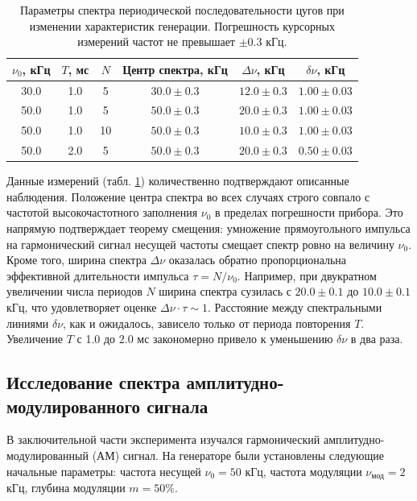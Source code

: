 \documentclass[reprint, amsmath, amssymb, aps, pra, nofootinbib]{revtex4-2}
\begin{document}
\begin{table}[ht!]
    \caption{Параметры спектра периодической последовательности цугов при изменении характеристик генерации. Погрешность курсорных измерений частот не превышает $\pm 0.3$ кГц.}
    \label{tab:burst_params}
    \centering
    \begin{ruledtabular}
    \begin{tabular}{cccccc}
        $\nu_0$, кГц & $T$, мс & $N$ & Центр спектра, кГц & $\Delta\nu$, кГц & $\delta\nu$, кГц \\
        \hline
        30.0 & 1.0 & 5  & $30.0 \pm 0.3$ & $12.0 \pm 0.3$ & $1.00 \pm 0.03$ \\
        50.0 & 1.0 & 5  & $50.0 \pm 0.3$ & $20.0 \pm 0.3$ & $1.00 \pm 0.03$ \\
        50.0 & 1.0 & 10 & $50.0 \pm 0.3$ & $10.0 \pm 0.3$ & $1.00 \pm 0.03$ \\
        50.0 & 2.0 & 5  & $50.0 \pm 0.3$ & $20.0 \pm 0.3$ & $0.50 \pm 0.03$ \\
    \end{tabular}
    \end{ruledtabular}
\end{table}

Данные измерений (табл. \ref{tab:burst_params}) количественно подтверждают описанные наблюдения. Положение центра спектра во всех случаях строго совпало с частотой высокочастотного заполнения $\nu_0$ в пределах погрешности прибора. Это напрямую подтверждает теорему смещения: умножение прямоугольного импульса на гармонический сигнал несущей частоты смещает спектр ровно на величину $\nu_0$. Кроме того, ширина спектра $\Delta\nu$ оказалась обратно пропорциональна эффективной длительности импульса $\tau = N/\nu_0$. Например, при двукратном увеличении числа периодов $N$ ширина спектра сузилась с $20.0 \pm 0.1$ до $10.0 \pm 0.1$ кГц, что удовлетворяет оценке $\Delta\nu \cdot \tau \sim 1$. Расстояние между спектральными линиями $\delta\nu$, как и ожидалось, зависело только от периода повторения $T$. Увеличение $T$ с 1.0 до 2.0 мс закономерно привело к уменьшению $\delta\nu$ в два раза.

\subsection{Исследование спектра амплитудно-модулированного сигнала}

В заключительной части эксперимента изучался гармонический амплитудно-модулированный (АМ) сигнал. На генераторе были установлены следующие начальные параметры: частота несущей $\nu_0 = 50$ кГц, частота модуляции $\nu_{\text{мод}} = 2$ кГц, глубина модуляции $m = 50\%$.
\end{document}
